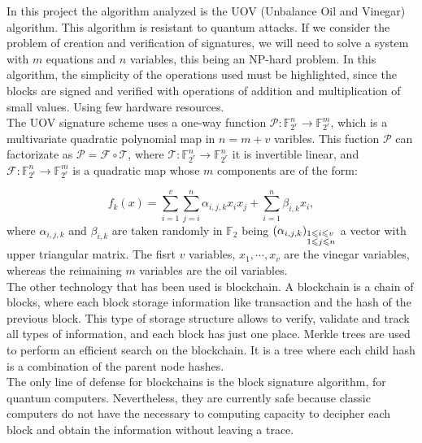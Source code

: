 In this project the algorithm analyzed is the UOV (Unbalance Oil and Vinegar) algorithm. This algorithm is resistant to quantum attacks. If we consider the problem of creation and verification of signatures, we will need to solve a system with $m$ equations and $n$ variables, this being an NP-hard problem. In this algorithm, the simplicity of the operations used must be highlighted, since the blocks are signed and verified with operations of addition and multiplication of small values. Using few hardware resources.\\

The UOV signature scheme uses a one-way function $\mathcal{P}: \mathds{F}_{2^r}^n \rightarrow \mathds{F}_{2^r}^m$, which is a multivariate quadratic polynomial map in $n = m + v$ varibles. This fuction $\mathcal{P}$ can factorizate as $\mathcal{P} = \mathcal{F} \circ \mathcal{T}$, where $\mathcal{T}: \mathds{F}_{2^r}^n \rightarrow \mathds{F}_{2^r}^n$ it is invertible linear, and $\mathcal{F}: \mathds{F}_{2^r}^n \rightarrow \mathds{F}_{2^r}^m$ is a quadratic map whose $m$ components are of the form:

\begin{equation}\label{eq:fun}
f_k(x) = \sum_{i=1}^v \sum_{j=i}^n \alpha_{i,j,k} x_i x_j + \sum_{i=1}^n \beta_{i,k} x_i,
\end{equation}
where $\alpha_{i,j,k}$ and $\beta_{i,k}$ are taken randomly in $\mathds{F}_2$ being $\left(\alpha_{i,j,k}\right)_{\begin{subarray}{l}{1\leqslant i \leqslant v }\\ {1 \leqslant j \leqslant n}\end{subarray}}$ a vector with upper triangular matrix. The fisrt $v$ variables, $x_1, \cdots, x_v$ are the vinegar variables, whereas the reimaining $m$ variables are the oil variables.\\

The other technology that has been used is blockchain. A blockchain is a chain of blocks, where each block storage information like transaction and the hash of the previous block. This type of storage structure allows to verify, validate and track all types of information, and each block has just one place. Merkle trees are used to perform an efficient search on the blockchain. It is a tree where each child hash is a combination of the parent node hashes.\\

The only line of defense for blockchains is the block signature algorithm, for quantum computers. Nevertheless, they are currently safe because classic computers do not have the necessary to computing capacity to decipher each block and obtain the information without leaving a trace.\\

